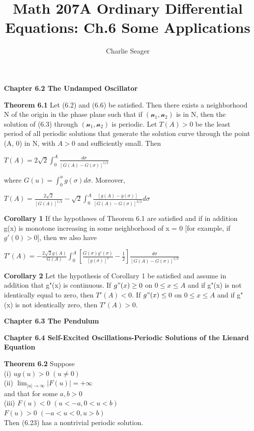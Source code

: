 \documentclass{article}
\newcommand\tab[1][1cm]{\hspace*{#1}}
\begin{document}
\title {Math 207A Ordinary Differential Equations: Ch.6 Some Applications}

\author{Charlie Seager}

\maketitle

\textbf {Chapter 6.2 The Undamped Oscillator}

\textbf {Theorem 6.1} Let (6.2) and (6.6) be satisfied. Then there exists a neighborhood N of the origin in the phase plane such that if $(\mathscr{n}_1, \mathscr{n}_2)$ is in N, then the solution of (6.3) through $(\mathscr{n}_1, \mathscr{n}_2)$ is periodic. Let $T(A) > 0$ be the least period of all periodic solutions that generate the solution curve through the point (A, 0) in N, with $A > 0$ and sufficiently small. Then
\begin{center}
$T(A) = 2 \sqrt{2} \int_0^A \frac{d \sigma}{[G(A) - G(\sigma)]^{1/2}}$
\end{center}
where $G(u) = \int_0^u g(\sigma) d\sigma$. Moreover,
\begin{center}
$T(A) = \frac{2 \sqrt{2}}{[G(A)]^{1/2}} - \sqrt{2} \int_0^A \frac{[g(A)-g(\sigma)]}{[G(A) - G(\sigma)]^{3/2}} d \sigma$
\end{center}

\textbf {Corollary 1} If the hypotheses of Theorem 6.1 are satisfied and if in addition g(x) is monotone increasing in some neighborhood of x = 0 [for example, if $g'(0)>0$], then we also have
\begin{center}
$T'(A) = - \frac{2 \sqrt{2}g(A)}{G(A)} \int_0^A [\frac{G(\sigma)g'(\sigma)}{[g(\sigma)]^2} - \frac{1}{2}] \frac{d \sigma}{[G(A) - G(\sigma)]^{1/2}}$
\end{center}

\textbf {Corollary 2} Let the hypothesis of Corollary 1 be satisfied and assume in addition that g"(x) is continuous. If $g"(x) \geq 0$ on $0 \leq x \leq A$ and if g"(x) is not identically equal to zero, then $T'(A) < 0$. If $g"(x) \leq 0$ on $0 \leq x \leq A$ and if g"(x) is not identically zero, then $T'(A) > 0$.

\textbf {Chapter 6.3 The Pendulum}

\textbf {Chapter 6.4 Self-Excited Oscillations-Periodic Solutions of the Lienard Equation}

\textbf {Theorem 6.2} Suppose \\
(i) $ug(u) > 0$ \tab $(u \neq 0)$ \\
(ii) $\lim_{|u| \to \infty} |F(u)| = + \infty$ \\
and that for some $a, b > 0$ \\
(iii) $F(u) < 0$ \tab $(u < -a, 0<u<b)$ \\
\tab $F(u) > 0$ \tab $(-a < u < 0, u > b)$ \\
Then (6.23) has a nontrivial periodic solution.
\end{document}
